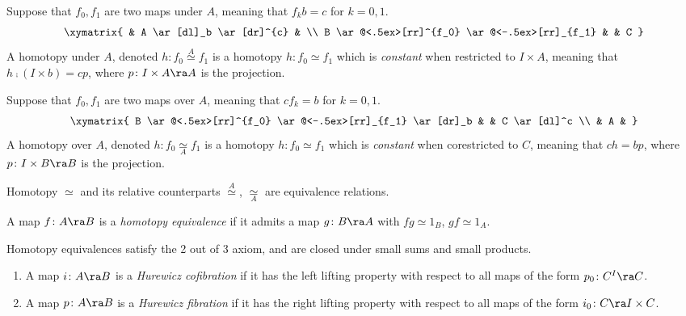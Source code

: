\begin{defn}
\label{defn:homotopyundera}
Suppose that $f_0, f_1$ are two maps under $A$, meaning that $f_kb=c$ for $k = 0, 1$.
\[
\xymatrix{
  & A \ar[dl]_b \ar[dr]^{c} & \\
  B \ar@<.5ex>[rr]^{f_0} \ar@<-.5ex>[rr]_{f_1} & & C
}
\]
A homotopy under $A$, denoted $h \colon f_0 \overset{A}{\simeq} f_1$ is a homotopy $h \colon f_0 \simeq f_1$ which is {\it constant} when restricted to $I \times A$, meaning that $h \comp (I \times b) = cp$, where $p \colon I \times A \ra A$ is the projection.
\end{defn}

\begin{defn}
\label{defn:homotopyovera}
Suppose that $f_0, f_1$ are two maps over $A$, meaning that $cf_k=b$ for $k = 0, 1$.
\[
\xymatrix{
  B \ar@<.5ex>[rr]^{f_0} \ar@<-.5ex>[rr]_{f_1} \ar[dr]_b & & C \ar[dl]^c \\
  & A &
}
\]
A homotopy over $A$, denoted $h \colon f_0 \underset{A}{\simeq} f_1$ is a homotopy $h \colon f_0 \simeq f_1$ which is {\it constant} when corestricted to $C$, meaning that $ch = bp$, where $p \colon I \times B \ra B$ is the projection.
\end{defn}

Homotopy $\simeq$ and its relative counterparts $\overset{A}{\simeq}$, $\underset{A}{\simeq}$ are equivalence relations.

\begin{defn}
\label{defn:homotequiv}
A map $f \colon A \ra B$ is a {\it homotopy equivalence} if it admits a map $g \colon B \ra A$ with $fg \simeq 1_B$, $gf \simeq 1_A$.
\end{defn}

Homotopy equivalences satisfy the 2 out of 3 axiom, and are closed under small sums and small products.

\begin{defn}
\label{defn:hep}
\mbox{}
\begin{enumerate}
\item
A map $i \colon A \ra B$ is a {\it Hurewicz cofibration} if it has the left lifting property with respect to all maps of the form $p_0 \colon C^I \ra C$.
\item
A map $p \colon A \ra B$ is a {\it Hurewicz fibration}  if it has the right lifting property with respect to all maps of the form $i_0 \colon C \ra I \times C$.
\end{enumerate}
\end{defn}

